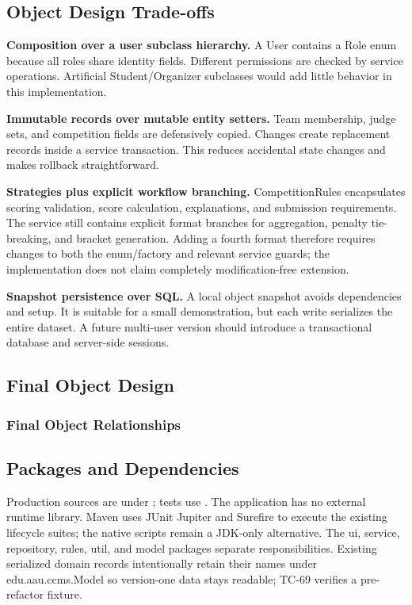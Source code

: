\subsection{Object Design Trade-offs}
\textbf{Composition over a user subclass hierarchy.} A User contains a Role enum because all roles share identity fields. Different permissions are checked by service operations. Artificial Student/Organizer subclasses would add little behavior in this implementation.

\textbf{Immutable records over mutable entity setters.} Team membership, judge sets, and competition fields are defensively copied. Changes create replacement records inside a service transaction. This reduces accidental state changes and makes rollback straightforward.

\textbf{Strategies plus explicit workflow branching.} CompetitionRules encapsulates scoring validation, score calculation, explanations, and submission requirements. The service still contains explicit format branches for aggregation, penalty tie-breaking, and bracket generation. Adding a fourth format therefore requires changes to both the enum/factory and relevant service guards; the implementation does not claim completely modification-free extension.

\textbf{Snapshot persistence over SQL.} A local object snapshot avoids dependencies and setup. It is suitable for a small demonstration, but each write serializes the entire dataset. A future multi-user version should introduce a transactional database and server-side sessions.
\begin{umlpage}
\subsection{Final Object Design}
\clearpage\subsubsection*{Final Object Relationships}
\end{umlpage}
\begin{umlpage}
\subsection{Packages and Dependencies}
\end{umlpage}
Production sources are under ; tests use . The application has no external runtime library. Maven uses JUnit Jupiter and Surefire to execute the existing lifecycle suites; the native scripts remain a JDK-only alternative. The ui, service, repository, rules, util, and model packages separate responsibilities. Existing serialized domain records intentionally retain their names under edu.aau.ccms.Model so version-one data stays readable; TC-69 verifies a pre-refactor fixture.
